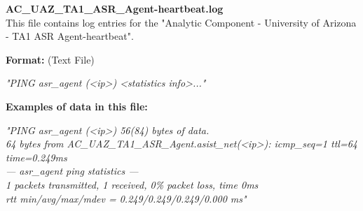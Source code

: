 \begin{description}
\begin{addmargin}[0em]{0em}
    \label{AC_UAZ_TA1_ASR_Agent-heartbeat.log}
    \begin{addmargin}[1em]{0em} %
        \textbf{AC\_UAZ\_TA1\_ASR\_Agent-heartbeat.log}\\
        This file contains log entries for the "Analytic Component - University of Arizona - TA1 ASR Agent-heartbeat".
        \begin{addmargin}[1em]{0em}
            \textbf{Format:} (Text File)
            \begin{addmargin}[1em]{0em}
                \textit{"PING asr\_agent (<ip>) <statistics info>..."}
            \end{addmargin}
        \end{addmargin}
        \begin{addmargin}[1em]{0em}
            \textbf{Examples of data in this file:}
            \begin{addmargin}[1em]{0em}\textit{"PING asr\_agent (<ip>) 56(84) bytes of data.\\
                64 bytes from AC\_UAZ\_TA1\_ASR\_Agent.asist\_net(<ip>): icmp\_seq=1 ttl=64 time=0.249ms\\
                --- asr\_agent ping statistics ---\\
                1 packets transmitted, 1 received, 0\% packet loss, time 0ms\\
                rtt min/avg/max/mdev = 0.249/0.249/0.249/0.000 ms"}
            \end{addmargin}
        \end{addmargin}
    \end{addmargin} %
    \textbf{\\}


\end{addmargin}
\end{description}
